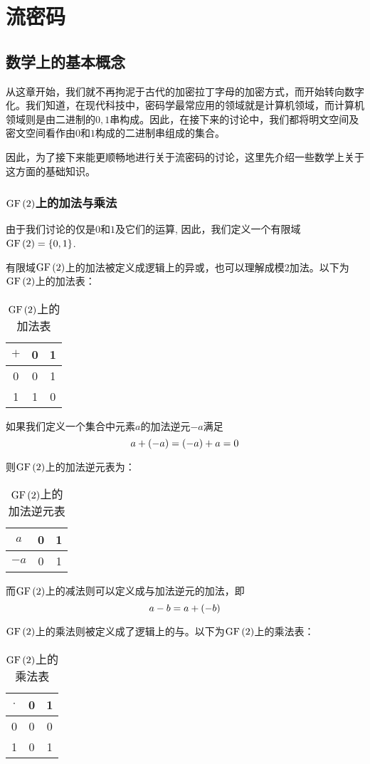 \chapter{流密码}
\section{数学上的基本概念}
从这章开始，我们就不再拘泥于古代的加密拉丁字母的加密方式，而开始转向数字化。我们知道，在现代科技中，密码学最常应用的领域就是计算机领域，而计算机领域则是由二进制的$0, 1$串构成。因此，在接下来的讨论中，我们都将明文空间及密文空间看作由$0$和$1$构成的二进制串组成的集合。\par
因此，为了接下来能更顺畅地进行关于流密码的讨论，这里先介绍一些数学上关于这方面的基础知识。
\subsection{$\mathrm{GF}\left( {2}\right)$上的加法与乘法}
由于我们讨论的仅是$0$和$1$及它们的运算, 因此，我们定义一个有限域$\mathrm{GF}\left( {2}\right)=\left\{ {0, 1} \right\}$. \par
有限域$\mathrm{GF}\left( {2}\right)$上的加法被定义成逻辑上的异或，也可以理解成模$2$加法。以下为$\mathrm{GF}\left( {2}\right)$上的加法表：
\begin{table}[H]
    \centering
    \caption{$\mathrm{GF}\left( {2}\right)$上的加法表}
    \begin{tabular}{c|cc}\hline
        $+$&0&1\\\hline
        0&0&1\\
        1&1&0\\\hline
    \end{tabular}
\end{table}

如果我们定义一个集合中元素$a$的加法逆元$-a$满足
\[a+\left( {-a}\right)=\left( {-a}\right)+a=0\]

则$\mathrm{GF}\left( {2}\right)$上的加法逆元表为：
\begin{table}[H]
    \centering
    \caption{$\mathrm{GF}\left( {2}\right)$上的加法逆元表}
    \begin{tabular}{c|cc}\hline
        $a$&0&1\\\hline
        $-a$&0&1\\\hline
    \end{tabular}
\end{table}

而$\mathrm{GF}\left( {2}\right)$上的减法则可以定义成与加法逆元的加法，即
\begin{equation}
    a-b=a+\left( {-b}\right)
\end{equation}

$\mathrm{GF}\left( {2}\right)$上的乘法则被定义成了逻辑上的与。以下为$\mathrm{GF}\left( {2}\right)$上的乘法表：
\begin{table}[H]
    \centering
    \caption{$\mathrm{GF}\left( {2}\right)$上的乘法表}
    \begin{tabular}{c|cc}\hline
        $\cdot$&0&1\\\hline
        0&0&0\\
        1&0&1\\\hline
    \end{tabular}
\end{table}

